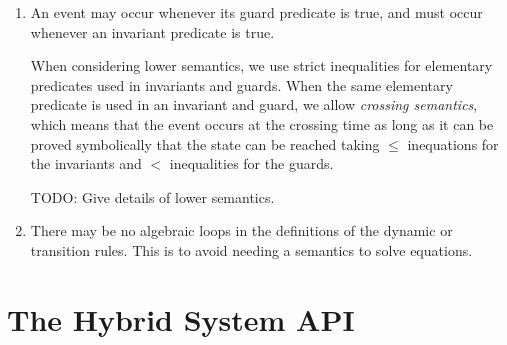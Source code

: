\documentclass[a4paper,11pt]{article}
\begin{document}
\begin{enumerate}[(S1)]
 \item An event may occur whenever its guard predicate is true, and must occur whenever an invariant predicate is true. 
  
  When considering lower semantics, we use strict inequalities for elementary predicates used in invariants and guards. When the same elementary predicate is used in an invariant and guard, we allow \emph{crossing semantics}, which means that the event occurs at the crossing time as long as it can be proved symbolically that the state can be reached taking $\leq$ inequations for the invariants and $<$ inequalities for the guards.

  TODO: Give details of lower semantics.

 \item There may be no algebraic loops in the definitions of the dynamic or transition rules. This is to avoid needing a semantics to solve equations.
\end{enumerate}


\newpage

\section{The Hybrid System API}
\end{document}
